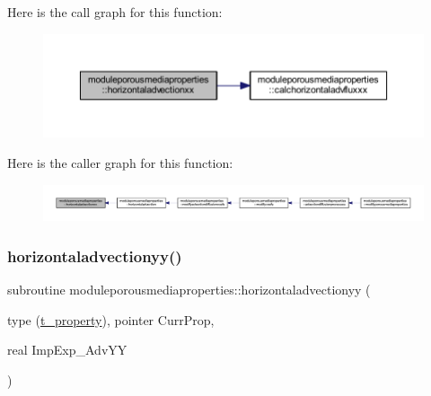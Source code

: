 Here is the call graph for this function\+:\nopagebreak
\begin{figure}[H]
\begin{center}
\leavevmode
\includegraphics[width=350pt]{namespacemoduleporousmediaproperties_a8e5f48df8b88839f3c864bb3668c251a_cgraph}
\end{center}
\end{figure}
Here is the caller graph for this function\+:\nopagebreak
\begin{figure}[H]
\begin{center}
\leavevmode
\includegraphics[width=350pt]{namespacemoduleporousmediaproperties_a8e5f48df8b88839f3c864bb3668c251a_icgraph}
\end{center}
\end{figure}
\mbox{\label{namespacemoduleporousmediaproperties_a4de4628b721cc4ace9457a05e6b46f11}} 
\subsubsection{\texorpdfstring{horizontaladvectionyy()}{horizontaladvectionyy()}}
{\footnotesize\ttfamily subroutine moduleporousmediaproperties\+::horizontaladvectionyy (\begin{DoxyParamCaption}\item[{type (\mbox{\hyperlink{structmoduleporousmediaproperties_1_1t__property}{t\+\_\+property}}), pointer}]{Curr\+Prop,  }\item[{real}]{Imp\+Exp\+\_\+\+Adv\+YY }\end{DoxyParamCaption})\hspace{0.3cm}{\ttfamily [private]}}

